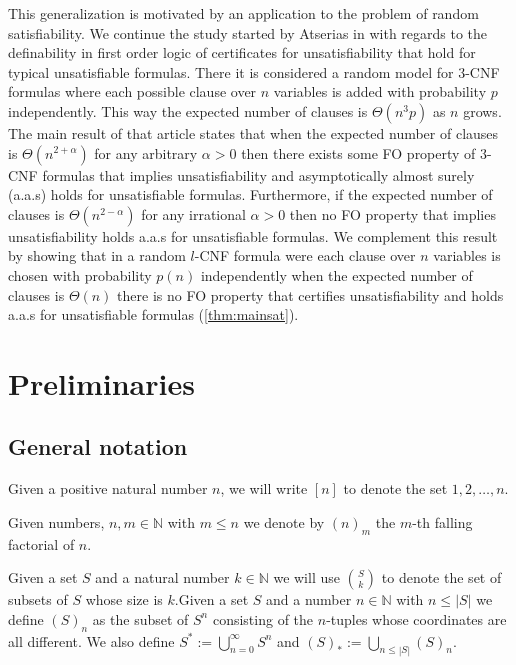 \documentclass[12pt,notitlepage,a4paper]{article}
\theoremstyle{definition}
\newcommand{\N}{\mathbb{N}}
\begin{document}
This generalization is motivated by an application to the problem of random 
satisfiability. We continue the study started by Atserias in \cite{atserias2005definability}
with regards to the definability in first order logic of certificates for unsatisfiability
that hold for typical unsatisfiable formulas. There it is considered a random model for
$3$-CNF formulas where each possible clause over $n$ variables is added with probability $p$ 
independently. This way the expected number of clauses is $\Theta(n^3p)$ as $n$ grows.
The main result of that article states that when the expected number of clauses is
$\Theta(n^{2+\alpha})$ for any arbitrary $\alpha>0$ then there exists some 
FO property of $3$-CNF formulas that implies
unsatisfiability and asymptotically almost surely (a.a.s) holds for unsatisfiable formulas. 
Furthermore, if the expected number of clauses is $\Theta(n^{2-\alpha})$ for any irrational
$\alpha>0$ then no FO property that implies unsatisfiability holds a.a.s
for unsatisfiable formulas. We complement this result by showing that 
in a random $l$-CNF formula were each clause over $n$ variables is chosen  
with probability $p(n)$ independently when the expected number of clauses is 
$\Theta(n)$ there is no FO property that certifies unsatisfiability and
holds a.a.s for unsatisfiable formulas (\cref{thm:mainsat}). 




\section{Preliminaries}

\subsection{General notation}\label{subsect:notation}

Given a positive natural number $n$, we will write
$[n]$ to denote the set ${1,2,\dots,n}$.\par
Given numbers, $n,m\in \N$ with $m\leq n$ we denote by
$(n)_m$ the $m$-th falling factorial of $n$. \par
Given a set $S$ and a natural number $k\in \N$
we will use $\binom{S}{k}$ to denote the set of 
subsets of $S$ whose size is $k$.Given a set
$S$ and a number $n\in \N$ with $n\leq |S|$ we define
$(S)_n$ as the subset of $S^n$ consisting of the $n$-tuples
whose coordinates are all different. 
We also define $S^*:=\bigcup_{n=0}^\infty S^n$ and
$(S)_*:=\bigcup_{n\leq |S|} (S)_n$. \par
\end{document}

